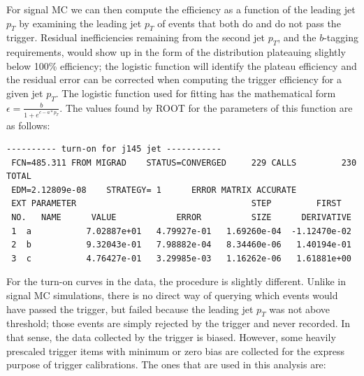 For signal MC we can then compute the efficiency as a function of the leading jet $p_T$ by
examining the leading jet $p_T$ of events that both do and do not pass the trigger.
Residual inefficiencies remaining from the second jet $p_T$, and the $b$-tagging requirements,
would show up in the form of the distribution plateauing slightly below 100\% efficiency;
the logistic function will identify the plateau efficiency and the residual error can be corrected when
computing the trigger efficiency for a given jet $p_T$.  The logistic function used for 
fitting has the mathematical form $\epsilon = \frac{b}{1+e^{c-a*p_T}}$.  The values found
by ROOT for the parameters of this function are as follows:

\scriptsize
\begin{verbatim}
---------- turn-on for j145 jet -----------
 FCN=485.311 FROM MIGRAD    STATUS=CONVERGED     229 CALLS         230 TOTAL
 EDM=2.12809e-08    STRATEGY= 1      ERROR MATRIX ACCURATE 
 EXT PARAMETER                                   STEP         FIRST   
 NO.   NAME      VALUE            ERROR          SIZE      DERIVATIVE 
 1  a           7.02887e+01   4.79927e-01   1.69260e-04  -1.12470e-02
 2  b           9.32043e-01   7.98882e-04   8.34460e-06   1.40194e-01
 3  c           4.76427e-01   3.29985e-03   1.16262e-06   1.61881e+00
\end{verbatim}


\normalsize

For the turn-on curves in the data, the procedure is slightly different.  Unlike in signal
MC simulations, there is no direct way of querying which events would have passed the trigger, but failed
because the leading jet $p_T$ was not above threshold; those events are simply rejected by 
the trigger and never recorded.  In that sense, the data collected by the trigger is biased.
However, some heavily prescaled trigger items with minimum or zero bias are collected for 
the express purpose of trigger calibrations.  The ones that are used in this analysis are:

